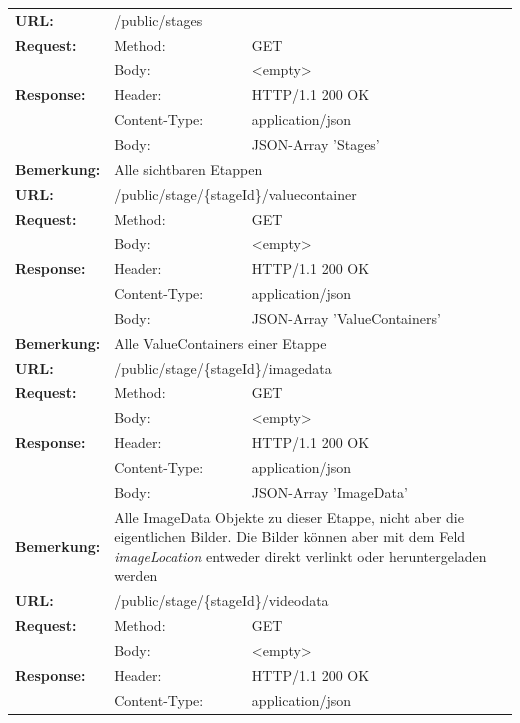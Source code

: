 {\renewcommand{\arraystretch}{1}
\begin{longtable}{ p{2.5cm} p{3.5cm} p{6cm}}
	\textbf{URL:} & \multicolumn{2}{l}{/public/stages} \\
	\textbf{Request:} & Method: & GET \\
		& Body: & <empty>\\
	\textbf{Response:} &  Header: & HTTP/1.1 200 OK \\
		& Content-Type: & application/json \\
		& Body: & JSON-Array 'Stages'\\
	\textbf{Bemerkung:} & \multicolumn{2}{p{10cm}}{Alle sichtbaren Etappen} \\
\hline
\hline    
	\textbf{URL:} & \multicolumn{2}{l}{/public/stage/\{stageId\}/valuecontainer} \\
	\textbf{Request:} & Method: & GET \\
		& Body: & <empty>\\
	\textbf{Response:} &  Header: & HTTP/1.1 200 OK \\
		& Content-Type: & application/json \\
		& Body: & JSON-Array 'ValueContainers'\\
	\textbf{Bemerkung:} & \multicolumn{2}{p{10cm}}{Alle ValueContainers einer Etappe} \\
\hline
\hline
	\textbf{URL:} & \multicolumn{2}{l}{/public/stage/\{stageId\}/imagedata} \\
	\textbf{Request:} & Method: & GET \\
		& Body: & <empty>\\
	\textbf{Response:} &  Header: & HTTP/1.1 200 OK \\
		& Content-Type: & application/json \\
		& Body: & JSON-Array 'ImageData'\\
	\textbf{Bemerkung:} & \multicolumn{2}{p{10cm}}{Alle ImageData Objekte zu dieser Etappe, nicht aber die eigentlichen Bilder. Die Bilder können aber mit dem Feld \textit{imageLocation} entweder direkt verlinkt oder heruntergeladen werden} \\
\hline
\hline
	\textbf{URL:} & \multicolumn{2}{l}{/public/stage/\{stageId\}/videodata} \\
	\textbf{Request:} & Method: & GET \\
		& Body: & <empty>\\
	\textbf{Response:} &  Header: & HTTP/1.1 200 OK \\
		& Content-Type: & application/json \\

\end{longtable}}
